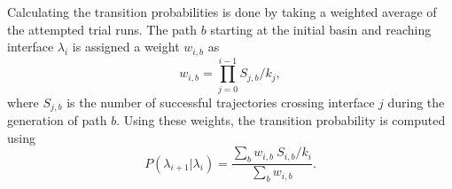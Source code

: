Calculating the transition probabilities is done by taking a weighted average of the
attempted trial runs. The path $b$ starting at the initial basin and reaching
interface $\lambda_i$ is assigned a weight $w_{i,b}$ as
\begin{equation}
   w_{i,b} = \prod_{j=0}^{i-1} S_{j,b}/k_j,
\end{equation}
where $S_{j,b}$ is the number of successful trajectories crossing interface $j$ during
the generation of path $b$. Using these weights, the transition probability is computed
using
\begin{equation}
   P(\lambda_{i+1} | \lambda_i) = \frac{\sum_{b} w_{i,b}\ S_{i,b}/k_i}{\sum_b w_{i,b}}.
\end{equation}

